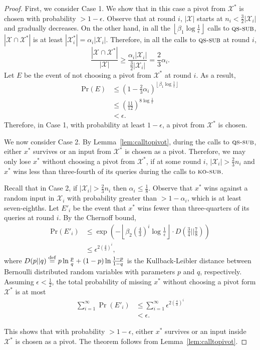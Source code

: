 \documentclass[twoside,11pt]{article}
\newcommand{\df}[1][\rm{def}]{\stackrel{#1}{=}}
\newcommand{\cX}{\mathcal{X}}
\newcommand{\pr}{\text{Pr}}
\newcommand{\algorithms}[1]{\textsc{#1}}
\newcommand{\algkosub}{\algorithms{ko-sub}}
\newcommand{\algqssub}{\algorithms{qs-sub}}
\newcommand{\maxx}{x^*}
\newcommand{\errorcomb}{\epsilon}
\begin{document}
\begin{proof}
First, we consider Case 1. We show that in this case a pivot from
$\cX^*$ is chosen with probability $> 1-\errorcomb$.  Observe that at
round $i$, $|\cX|$ starts at $n_i < \frac{3}{2}|\cX_i|$ and gradually
decreases. On the other hand, in all the $\left\lfloor\beta_1
\log\tfrac1\errorcomb\right\rfloor$ calls to $\algqssub$,
$|\cX\cap\cX^*|$ is at least $|\cX_i^*|=\alpha_i|\cX_i|$. Therefore,
in all the calls to $\algqssub$ at round $i$,
\[
 \frac{|\cX\cap\cX^*|}{|\cX|}\ge
 \frac{\alpha_i|\cX_i|}{\frac{3}{2}|\cX_i|}=\frac23\alpha_i.
\]
Let $E$ be the event of not choosing a pivot from $\cX^*$ at round
$i$. As a result,
\begin{align*}
 \pr(E)&\le \left(1-\tfrac23\alpha_i\right)^{\left\lfloor\beta_1\log\tfrac1\errorcomb\right\rfloor}\\
 &\le \left(\tfrac{11}{12}\right)^{8\log\tfrac1\errorcomb}\\
 &<\errorcomb.
\end{align*}
Therefore, in Case 1, with probability at least $1-\errorcomb$, a
pivot from $\cX^*$ is chosen.

We now consider Case 2. By Lemma~\ref{lem:calltopivot}, during the
calls to $\algqssub$, either $\maxx$ survives or an input from $\cX^*$
is chosen as a pivot.  Therefore, we may only lose $\maxx$ without
choosing a pivot from $\cX^*$, if at some round $i$, $|\cX_i|>\frac23
n_i$ and $\maxx$ wins less than three-fourth of its queries during the
calls to $\algkosub$.

Recall that in Case 2, if $|\cX_i|>\frac23 n_i$ then $\alpha_i\le
\frac18$. Observe that $\maxx$ wins against a random input in $\cX_i$
with probability greater than $>1-\alpha_i$, which is at least
seven-eighths. Let $E'_i$ be the event that $\maxx$ wins fewer than
three-quarters of its queries at round $i$. By the Chernoff bound,
\begin{align*}
 \pr(E'_i)&\le \exp\left(-\left\lfloor\beta_2 \left(\tfrac43\right)^i \log\tfrac{1}{\errorcomb}\right\rfloor\cdot D\left(\tfrac34||\tfrac78\right) \right)\\
 &\le \errorcomb^{2\left(\tfrac43\right)^i},
\end{align*}
where $D(p||q) \df p \ln \frac{p}{q} + (1-p) \ln \frac{1-p}{1-q}$ is
the Kullback-Leibler distance between Bernoulli distributed random
variables with parameters $p$ and $q$, respectively. Assuming
$\errorcomb<\frac12$, the total probability of missing $\maxx$ without
choosing a pivot form $\cX^*$ is at most
\begin{align*}
 \sum_{i=1}^{\infty} \Pr(E'_i) &\le \sum_{i=1}^{\infty} \errorcomb^{2\left(\tfrac43\right)^i}\\ 
 &< \errorcomb.
\end{align*}

This shows that with probability $> 1-\errorcomb$, either
$\maxx$ survives or an input inside $\cX^*$ is chosen as a pivot. The
theorem follows from Lemma~\ref{lem:calltopivot}.
\end{proof}
\end{document}

